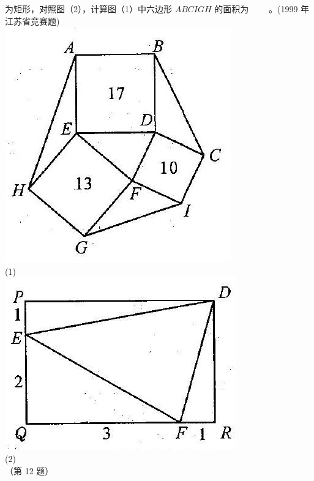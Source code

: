 \documentclass[10pt]{article}
\begin{document}
为矩形，对照图（2），计算图（1）中六边形 $A B C I G H$ 的面积为 $\qquad$。(1999 年江苏省竞赛题)\\
\includegraphics[max width=\textwidth, center]{2024_10_30_2c8f45efd4a519b08e1ag-136(3)}\\
(1)\\
\includegraphics[max width=\textwidth, center]{2024_10_30_2c8f45efd4a519b08e1ag-136(1)}\\
(2)\\
（第 12 题）
\end{document}
